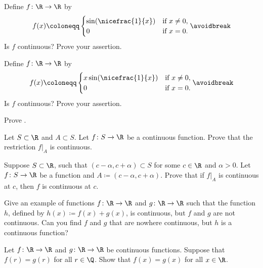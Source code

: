 \begin{exercise}
Define $f \colon \R \to \R$ by
\begin{equation*}
f(x) \coloneqq
\begin{cases}
\sin(\nicefrac{1}{x}) & \text{if } x \not= 0, \\
0 & \text{if } x=0.
\end{cases}
\avoidbreak
\end{equation*}
Is $f$ continuous?  Prove your assertion.
\end{exercise}

\begin{exercise}
Define $f \colon \R \to \R$ by
\begin{equation*}
f(x) \coloneqq
\begin{cases}
x \sin(\nicefrac{1}{x}) & \text{if } x \not= 0, \\
0 & \text{if } x=0.
\end{cases}
\avoidbreak
\end{equation*}
Is $f$ continuous?  Prove your assertion.
\end{exercise}

\begin{exercise}
Prove .
\end{exercise}

\begin{exercise} \label{exercise:restrictioncontinuous}
Let $S \subset \R$ and $A \subset S$.  Let $f \colon S \to \R$
be a continuous function.
Prove that the restriction $f|_A$ is continuous.
\end{exercise}

\begin{exercise}
Suppose $S \subset \R$, such that $(c-\alpha,c+\alpha) \subset S$ for some $c \in \R$
and $\alpha > 0$.
Let $f \colon S \to \R$ be a function and $A \coloneqq (c-\alpha,c+\alpha)$.  Prove that
if $f|_A$ is continuous at $c$, then $f$ is continuous at $c$.
\end{exercise}

\begin{exercise}
Give an example of functions $f \colon \R \to \R$ and $g \colon \R \to \R$
such that the function $h$, defined by $h(x) \coloneqq f(x) + g(x)$, is continuous,
but $f$ and $g$ are not continuous.  Can you find $f$ and $g$ that are nowhere
continuous, but $h$ is a continuous function?
\end{exercise}

\begin{exercise}
Let $f \colon \R \to \R$ and 
$g \colon \R \to \R$ be continuous functions.  Suppose that
$f(r) = g(r)$ for all $r \in \Q$.
Show that $f(x) = g(x)$ for all $x \in \R$.
\end{exercise}

